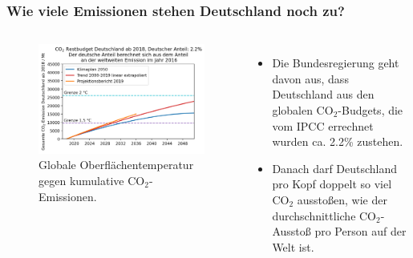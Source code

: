 \begin{frame}
  \frametitle{Wie viele Emissionen stehen Deutschland noch zu?}
  \begin{columns}
      \begin{figure}
		    \centering
		    \includegraphics[width=\linewidth]{bilder/restbudget_de_new.png}
		    \caption{Globale Oberflächentemperatur gegen kumulative CO$_2$-Emissionen.}
      \end{figure}
      \begin{itemize}
        \item Die Bundesregierung geht davon aus, dass Deutschland aus den globalen CO$_2$-Budgets, die vom IPCC errechnet wurden ca. 2.2\% zustehen.
        \item Danach darf Deutschland pro Kopf doppelt so viel CO$_2$ ausstoßen, wie der durchschnittliche CO$_2$-Ausstoß pro Person auf der Welt ist.
      \end{itemize}
    \end{columns}

\end{frame}

